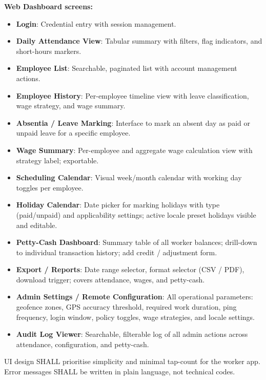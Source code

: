 \documentclass[12pt, a4paper]{article}
\begin{document}
\textbf{Web Dashboard screens:}
\begin{itemize}
    \item \textbf{Login}: Credential entry with session management.
    \item \textbf{Daily Attendance View}: Tabular summary with filters,
          flag indicators, and short-hours markers.
    \item \textbf{Employee List}: Searchable, paginated list with account
          management actions.
    \item \textbf{Employee History}: Per-employee timeline view with
          leave classification, wage strategy, and wage summary.
    \item \textbf{Absentia / Leave Marking}: Interface to mark an absent
          day as paid or unpaid leave for a specific employee.
    \item \textbf{Wage Summary}: Per-employee and aggregate wage
          calculation view with strategy label; exportable.
    \item \textbf{Scheduling Calendar}: Visual week/month calendar with
          working day toggles per employee.
    \item \textbf{Holiday Calendar}: Date picker for marking holidays
          with type (paid/unpaid) and applicability settings; active
          locale preset holidays visible and editable.
    \item \textbf{Petty-Cash Dashboard}: Summary table of all worker
          balances; drill-down to individual transaction history; add
          credit / adjustment form.
    \item \textbf{Export / Reports}: Date range selector, format
          selector (CSV / PDF), download trigger; covers attendance,
          wages, and petty-cash.
    \item \textbf{Admin Settings / Remote Configuration}: All operational
          parameters: geofence zones, GPS accuracy threshold, required
          work duration, ping frequency, login window, policy toggles,
          wage strategies, and locale settings.
    \item \textbf{Audit Log Viewer}: Searchable, filterable log of all
          admin actions across attendance, configuration, and petty-cash.
\end{itemize}

UI design SHALL prioritise simplicity and minimal tap-count for the
worker app. Error messages SHALL be written in plain language, not
technical codes.
\end{document}
